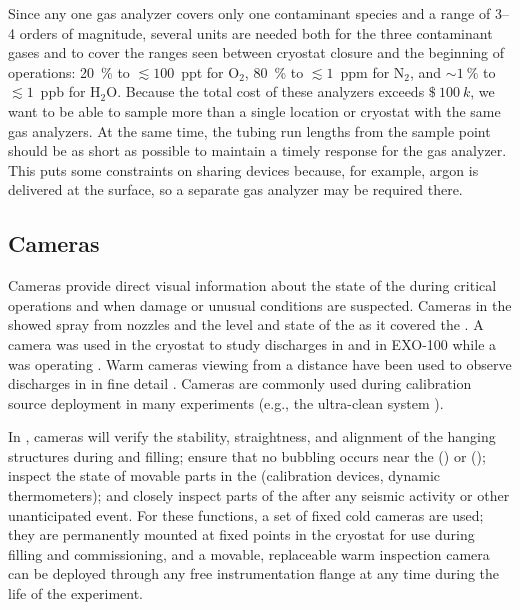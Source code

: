 Since any one gas analyzer covers only one contaminant species and a range of \numrange{3}{4} orders of magnitude, several units are needed both for the three contaminant gases and to cover the ranges seen between  cryostat closure and the beginning of  operations:
\SI{20}{\percent} to $\lesssim 100$~ppt for $\text{O}_2$,
\SI{80}{\percent} to $\lesssim 1$~ppm for $\text{N}_2$, and
$\sim \SI{1}{\percent}$ to $\lesssim 1$~ppb for $\text{H}_2\text{O}$.
Because the total cost of these analyzers exceeds $\SI{100}[\mathdollar]{k}$, we want to be able to  sample more than a single location or cryostat with the same gas analyzers. At the same time, the tubing run lengths from the sample point should be as short as possible to maintain a timely response for the gas analyzer.  This puts some constraints on sharing devices because, for example, argon is delivered at the surface, so a separate gas analyzer may be required there. %


\subsection{Cameras}

Cameras provide direct visual information about the state of the
 during critical operations and when damage or unusual
conditions are suspected.  Cameras in the  showed spray from \cooldown
nozzles and the level and state of the  as it covered the  \cite{Murphy:20170516}.  A camera was
used in the  
cryostat\cite{Adamowski:2014daa} to study  discharges in
 and in EXO-100 while a  was operating
\cite{Delaquis:2013hva}.  Warm cameras viewing  from a distance
have been used to observe  discharges in  in
fine detail \cite{Auger:2015xlo}.  Cameras are commonly used during
calibration source deployment in many experiments (e.g., the
\kamland ultra-clean system \cite{Banks:2014hra}).

In , cameras will verify the stability, straightness,
and alignment of the hanging  structures during \cooldown and
filling; ensure that no bubbling occurs near the 
(\single) or  (\dual);  inspect the
state of movable parts in the  (calibration devices, dynamic
thermometers); and  closely inspect parts of the  after any seismic activity or other unanticipated
event.  For these functions, a set of fixed
cold cameras are used; they are permanently mounted at fixed points in the cryostat
for use during filling and commissioning, and a movable, replaceable
warm inspection camera can be deployed through any free
instrumentation flange at any time during the life of the
experiment. 

